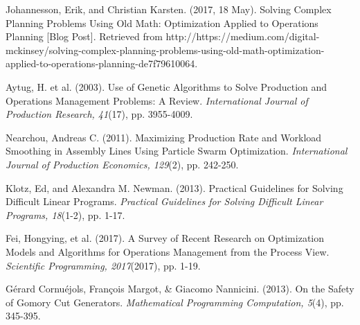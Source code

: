 \documentclass{article}
\begin{document}
	\newpage
	\begin{thebibliography}{6}
	
Johannesson, Erik, and Christian Karsten. (2017, 18 May). Solving Complex Planning Problems Using Old Math: Optimization Applied to Operations Planning [Blog Post]. Retrieved 
from http://https://medium.com/digital-mckinsey/solving-complex-planning-problems-using-old-math-optimization-applied-to-operations-planning-de7f79610064.
	
Aytug, H. et al. (2003). Use of Genetic Algorithms to Solve Production and Operations Management Problems: A Review. 
\textit{International Journal of Production Research, 41}(17), pp. 3955-4009.

Nearchou, Andreas C. (2011). Maximizing Production Rate and Workload Smoothing in Assembly Lines Using Particle Swarm Optimization. 
\textit{International Journal of Production Economics, 129}(2), pp. 242-250.

Klotz, Ed, and Alexandra M. Newman. (2013). Practical Guidelines for Solving Difficult Linear Programs. 
\textit{Practical Guidelines for Solving Difficult Linear Programs, 18}(1-2), pp. 1-17.

Fei, Hongying, et al. (2017). A Survey of Recent Research on Optimization Models and Algorithms for Operations Management from the Process View. 
\textit{Scientific Programming, 2017}(2017), pp. 1-19.

G\'{e}rard Cornu\'{e}jols, Fran\c{c}ois Margot, \& Giacomo Nannicini. (2013). On the Safety of Gomory Cut Generators. 
\textit{Mathematical Programming Computation, 5}(4), pp. 345-395.


\end{thebibliography}
\end{document}
